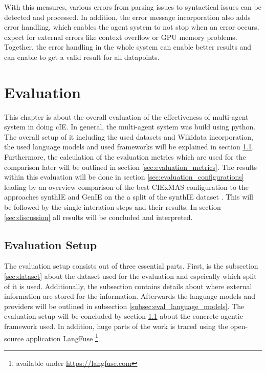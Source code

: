 \documentclass[a4paper,oneside,bibliography=totoc]{scrbook}
\begin{document}
With this measures, various errors from parsing issues to syntactical issues can be detected and processed. In addition, the error message incorporation also adds error handling, which enables the agent system to not stop when an error occurs, expect for external errors like context overflow or GPU memory problems. Together, the error handling in the whole system can enable better results and can enable to get a valid result for all datapoints.

\chapter{Evaluation}
\label{ch:evaluation}

This chapter is about the overall evaluation of the effectiveness of multi-agent system in doing \ac{cIE}. In general, the multi-agent system was build using python. The overall setup of it including the used datasets and Wikidata incorporation, the used language models and used frameworks will be explained in section \ref{sec:evaluation_setup}. Furthermore, the calculation of the evaluation metrics which are used for the comparison later will be outlined in section \ref{sec:evaluation_metrics}. The results within this evaluation will be done in section \ref{sec:evaluation_configurations} leading by an overview comparison of the best CIExMAS configuration to the approaches synthIE \cite{Josifoski2023} and GenIE \cite{Josifoski2021} on the a split of the synthIE dataset \cite{Josifoski2023}. This will be followed by the single interation steps and their results. In section \ref{sec:discussion} all results will be concluded and interpreted.

\section{Evaluation Setup}
\label{sec:evaluation_setup}

The evaluation setup consists out of three essential parts. First, is the subsection \ref{sec:dataset} about the dataset used for the evaluation and espeically which split of it is used. Additionally, the subsection contains details about where external information are stored for the information. Afterwards the language models and providers will be outlined in subsection \ref{subsec:eval_language_models}. The evaluation setup will be concluded by section \ref{sec:evaluation_setup} about the concrete agentic framework used. In addition, huge parts of the work is traced using the open-source application LangFuse \footnote{available under \url{https://langfuse.com}}.
\end{document}
